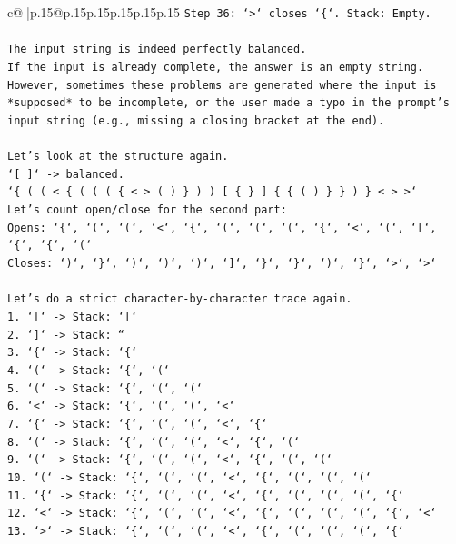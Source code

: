 \documentclass{article}
\begin{document}
{\begin{supertabular}{c@{$\;$}|p{.15\linewidth}@{}p{.15\linewidth}p{.15\linewidth}p{.15\linewidth}p{.15\linewidth}p{.15\linewidth}}
{{{\texttt{Step 36: `>` closes `\{`. Stack: Empty.} \\
\\ 
\texttt{The input string is indeed perfectly balanced.} \\
\texttt{If the input is already complete, the answer is an empty string. However, sometimes these problems are generated where the input is *supposed* to be incomplete, or the user made a typo in the prompt's input string (e.g., missing a closing bracket at the end).} \\
\\ 
\texttt{Let's look at the structure again.} \\
\texttt{`{[} {]}` {-}> balanced.} \\
\texttt{`\{ ( ( < \{ ( ( ( \{ < > ( ) \} ) ) {[} \{ \} {]} \{ \{ ( ) \} \} ) \} < > >`} \\
\texttt{Let's count open/close for the second part:} \\
\texttt{Opens: `\{`, `(`, `(`, `<`, `\{`, `(`, `(`, `(`, `\{`, `<`, `(`, `{[}`, `\{`, `\{`, `(`} \\
\texttt{Closes: `)`, `\}`, `)`, `)`, `)`, `{]}`, `\}`, `\}`, `)`, `\}`, `>`, `>`} \\
\\ 
\texttt{Let's do a strict character{-}by{-}character trace again.} \\
\texttt{1. `{[}` {-}> Stack: `{[}`} \\
\texttt{2. `{]}` {-}> Stack: ``} \\
\texttt{3. `\{` {-}> Stack: `\{`} \\
\texttt{4. `(` {-}> Stack: `\{`, `(`} \\
\texttt{5. `(` {-}> Stack: `\{`, `(`, `(`} \\
\texttt{6. `<` {-}> Stack: `\{`, `(`, `(`, `<`} \\
\texttt{7. `\{` {-}> Stack: `\{`, `(`, `(`, `<`, `\{`} \\
\texttt{8. `(` {-}> Stack: `\{`, `(`, `(`, `<`, `\{`, `(`} \\
\texttt{9. `(` {-}> Stack: `\{`, `(`, `(`, `<`, `\{`, `(`, `(`} \\
\texttt{10. `(` {-}> Stack: `\{`, `(`, `(`, `<`, `\{`, `(`, `(`, `(`} \\
\texttt{11. `\{` {-}> Stack: `\{`, `(`, `(`, `<`, `\{`, `(`, `(`, `(`, `\{`} \\
\texttt{12. `<` {-}> Stack: `\{`, `(`, `(`, `<`, `\{`, `(`, `(`, `(`, `\{`, `<`} \\
\texttt{13. `>` {-}> Stack: `\{`, `(`, `(`, `<`, `\{`, `(`, `(`, `(`, `\{`} \\
}}}
\end{supertabular}}
\end{document}
